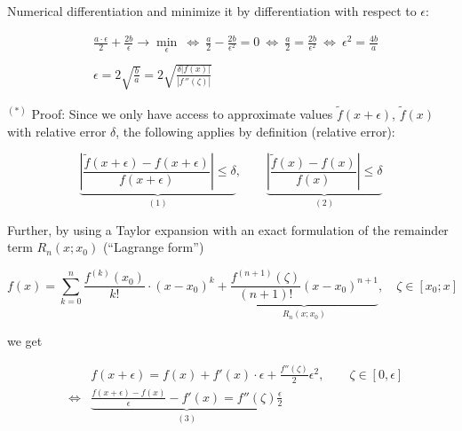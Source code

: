 \documentclass[11pt,compress,t,notes=noshow, xcolor=table]{beamer}
\begin{document}
\begin{vbframe}{Numerical differentiation}
  and minimize it by differentiation with respect to $\epsilon$:
  
  \vspace*{-0.5cm}
  
  \begin{footnotesize}
  \begin{eqnarray*}
  &\frac{a\cdot\epsilon}2 + \frac{2b}\epsilon \rightarrow
  \underset\epsilon {\min} \ \Leftrightarrow \ \frac a2 - \frac
  {2b}{\epsilon^2} = 0 \ \Leftrightarrow \ \frac a2 = \frac
  {2b}{\epsilon^2} \ \Leftrightarrow \ \epsilon^2=\frac{4b}a\\
  \\
  &\epsilon = 2 \sqrt{\frac ba} = 2
  \sqrt{\frac{\delta\left|f(x)\right|}{\left| f\!\,''(\zeta)\right|}}
  \end{eqnarray*}
  \end{footnotesize}
  
  
  \framebreak
  
  \begin{footnotesize}
  
  $^{(*)}$ Proof: Since we only have access to approximate values $\tilde f(x + \epsilon)$, $\tilde f(x)$ with relative error $\delta$, the following applies by definition (relative error):
  
  $$\underbrace{\left|\frac{\tilde f(x + \epsilon) - f(x + \epsilon)}{f(x + \epsilon)}\right| \le \delta}_{(1)},
  \qquad \underbrace{\left|\frac{\tilde f(x) - f(x)}{f(x)}\right| \le \delta}_{(2)}
  $$
  
  Further, by using a Taylor expansion with an exact formulation of the remainder term $R_n(x; x_0)$ (\enquote{Lagrange form}) 
  
  $$
    f(x) = \sum_{k = 0}^n \frac{f^{(k)}(x_0)}{k!} \cdot \left(x - x_0\right)^k + \underbrace{\frac{f^{(n + 1)} (\zeta)}{(n + 1)!} (x - x_0)^{n + 1}}_{R_n(x;x_0)}, \quad \zeta \in [x_0; x]
  $$
  
  we get 
  
  \vspace*{-0.5cm}
  
  \begin{eqnarray*}
    && f(x + \epsilon) = f(x) + f'(x) \cdot \epsilon + \frac{f''(\zeta)}{2} \epsilon^2, \qquad \zeta \in [0, \epsilon] \\
    &\Leftrightarrow& \underbrace{\frac{f(x + \epsilon) - f(x)}{\epsilon} - f'(x) = f''(\zeta) \frac{\epsilon}{2}}_{(3)} 
  \end{eqnarray*}
  
  \framebreak 
  

\end{footnotesize}
\end{vbframe}
\end{document}
